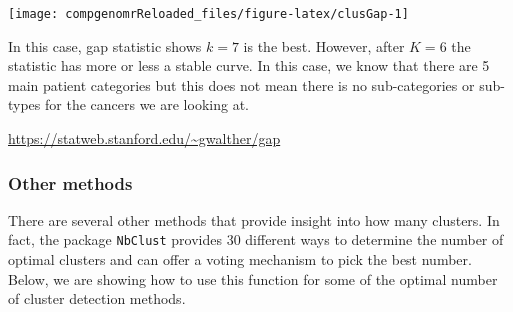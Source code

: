 \documentclass[12pt,]{krantz}
\newenvironment{Shaded}{\begin{snugshade}}{\end{snugshade}}
\newcommand{\CommentTok}[1]{\textcolor[rgb]{0.56,0.35,0.01}{\textit{#1}}}
\newcommand{\DataTypeTok}[1]{\textcolor[rgb]{0.13,0.29,0.53}{#1}}
\newcommand{\DecValTok}[1]{\textcolor[rgb]{0.00,0.00,0.81}{#1}}
\newcommand{\KeywordTok}[1]{\textcolor[rgb]{0.13,0.29,0.53}{\textbf{#1}}}
\newcommand{\NormalTok}[1]{#1}
\newcommand{\OperatorTok}[1]{\textcolor[rgb]{0.81,0.36,0.00}{\textbf{#1}}}
\newcommand{\StringTok}[1]{\textcolor[rgb]{0.31,0.60,0.02}{#1}}
\begin{document}
\begin{center}\texttt{[image: compgenomrReloaded\_files/figure-latex/clusGap-1]} \end{center}

In this case, gap statistic shows \(k=7\) is the best. However, after \(K=6\) the statistic has more or less a stable curve. In this case, we know that there are 5 main patient categories but this does not mean there is no sub-categories or sub-types for the cancers we are looking at.

\url{https://statweb.stanford.edu/~gwalther/gap}

\hypertarget{other-methods}{%
\subsubsection{Other methods}\label{other-methods}}

There are several other methods that provide insight into how many clusters. In fact, the package \texttt{NbClust} provides 30 different ways to determine the number of optimal clusters and can offer a voting mechanism to pick the best number. Below, we are showing how to use this function for some of the optimal number of cluster detection methods.

\begin{Shaded}
\end{Shaded}
\end{document}
